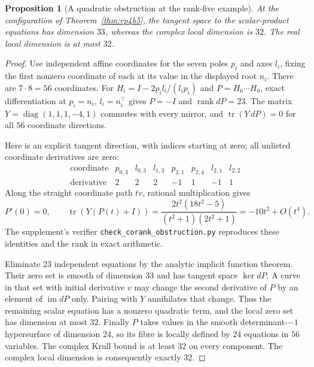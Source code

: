 \documentclass[11pt,a4paper]{article}
\theoremstyle{plain}
\newtheorem{proposition}[theorem]{Proposition}
\theoremstyle{definition}
\theoremstyle{remark}
\begin{document}
\begin{proposition}[A quadratic obstruction at the rank-five example]
\label{prop:quadratic-corank}
At the configuration of Theorem~\ref{thm:rp4b5}, the tangent space to the
scalar-product equations has dimension $33$, whereas the complex local
dimension is $32$. The real local dimension is at most $32$.
\end{proposition}

\begin{proof}
Use independent affine coordinates for the seven poles $p_i$ and axes $l_i$,
fixing the first nonzero coordinate of each at its value in the displayed
root $n_i$. There are $7\cdot8=56$ coordinates. For
$H_i=I-2p_il_i/(l_ip_i)$ and $P=H_6\cdots H_0$, exact differentiation at
$p_i=n_i$, $l_i=n_i^\top$ gives $P=-I$ and $\operatorname{rank}dP=23$.
The matrix $Y=\operatorname{diag}(1,1,1,-4,1)$ commutes with every mirror,
and $\operatorname{tr}(Y\,dP)=0$ for all $56$ coordinate directions.

Here is an explicit tangent direction, with indices starting at zero; all
unlisted coordinate derivatives are zero:
\[
\begin{array}{c|rrrrrrr}
\text{coordinate}&p_{0,3}&l_{0,3}&l_{1,3}&p_{2,1}&p_{2,4}&l_{2,1}&l_{2,2}\\
\hline
\text{derivative}&2&2&2&-1&1&-1&1
\end{array}
\]
Along the straight coordinate path $tv$, rational multiplication gives
\[
 P'(0)=0,\qquad
 \operatorname{tr}(Y(P(t)+I))
 =\frac{2t^2(18t^2-5)}{(t^2+1)(2t^2+1)}=-10t^2+O(t^4).
\]
The supplement's verifier \texttt{check\_corank\_obstruction.py}
reproduces these identities and the rank in exact arithmetic.

Eliminate $23$ independent equations by the analytic implicit function
theorem. Their zero set is smooth of dimension $33$ and has tangent space
$\ker dP$. A curve in that set with initial derivative $v$ may change the
second derivative of $P$ by an element of $\operatorname{im}dP$ only.
Pairing with $Y$ annihilates that change. Thus the remaining scalar equation
has a nonzero quadratic term, and the local zero set has dimension at most
$32$. Finally $P$ takes values in the smooth determinant-$-1$ hypersurface
of dimension $24$, so its fibre is locally defined by $24$ equations in
$56$ variables. The complex Krull bound is at least $32$ on every component.
The complex local dimension is consequently exactly $32$.
\end{proof}
\end{document}
